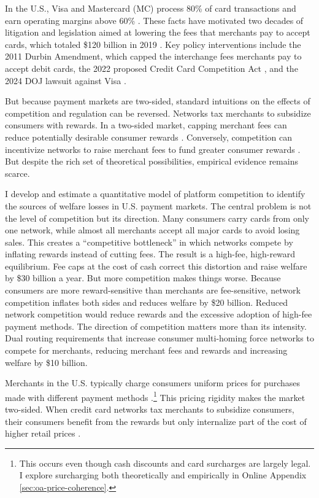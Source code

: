 \documentclass[main.tex]{subfiles}
\begin{document}
In the U.S., Visa and Mastercard (MC) process 80\% of card transactions and earn operating margins above 60\% \parencite{Visa2020}.
These facts have motivated two decades of litigation and legislation aimed at lowering the fees that merchants pay to accept cards, which totaled \$120 billion in 2019 \parencite{Nilson2020}. 
Key policy interventions include the 2011 Durbin Amendment, which capped the interchange fees merchants pay to accept debit cards, the 2022 proposed Credit Card Competition Act \parencite{Andriotis2022}, and the 2024 DOJ lawsuit against Visa \parencite{Au-Yeung2024}.

But because payment markets are two-sided, standard intuitions on the effects of competition and regulation can be reversed.
Networks tax merchants to subsidize consumers with rewards. 
In a two-sided market, capping merchant fees can reduce potentially desirable consumer rewards \parencite{Rochet.Tirole2003}. 
Conversely, competition can incentivize networks to raise merchant fees to fund greater consumer rewards \parencite{Edelman.Wright2015}.
But despite the rich set of theoretical possibilities, empirical evidence remains scarce.

I develop and estimate a quantitative model of platform competition to identify the sources of welfare losses in U.S. payment markets.
The central problem is not the level of competition but its direction.
Many consumers carry cards from only one network, while almost all merchants accept all major cards to avoid losing sales.
This creates a ``competitive bottleneck'' \parencite{Armstrong2006}in which networks compete by inflating rewards instead of cutting fees.
The result is a high-fee, high-reward equilibrium.
Fee caps at the cost of cash correct this distortion and raise welfare by \$30 billion a year.
But more competition makes things worse. 
Because consumers are more reward-sensitive than merchants are fee-sensitive, network competition inflates both sides and reduces welfare by \$20 billion.
Reduced network competition would reduce rewards and the excessive adoption of high-fee payment methods.
The direction of competition matters more than its intensity. 
Dual routing requirements that increase consumer multi-homing force networks to compete for merchants, reducing merchant fees and rewards and increasing welfare by \$10 billion.

Merchants in the U.S. typically charge consumers uniform prices for purchases made with different payment methods \parencite{Stavins2018}.\footnote{
    This occurs even though cash discounts and card surcharges are largely legal. I explore surcharging both theoretically and empirically in Online Appendix \ref{sec:oa-price-coherence}.
}
This pricing rigidity makes the market two-sided. 
When credit card networks tax merchants to subsidize consumers, their consumers benefit from the rewards but only internalize part of the cost of higher retail prices \parencite{Felt.etal2020}.
\end{document}
